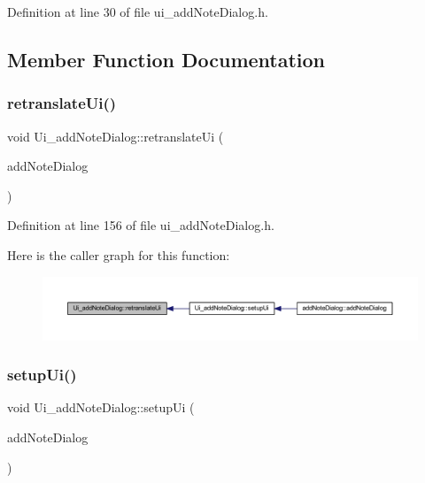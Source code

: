 Definition at line 30 of file ui\+\_\+add\+Note\+Dialog.\+h.



\subsection{Member Function Documentation}
\hypertarget{classUi__addNoteDialog_aab12c63dbd7ceae65cefd5be2a09c2ab}{}\label{classUi__addNoteDialog_aab12c63dbd7ceae65cefd5be2a09c2ab} 
\subsubsection{\texorpdfstring{retranslate\+Ui()}{retranslateUi()}}
{\footnotesize\ttfamily void Ui\+\_\+add\+Note\+Dialog\+::retranslate\+Ui (\begin{DoxyParamCaption}\item[{Q\+Widget $\ast$}]{add\+Note\+Dialog }\end{DoxyParamCaption})\hspace{0.3cm}{\ttfamily [inline]}}



Definition at line 156 of file ui\+\_\+add\+Note\+Dialog.\+h.

Here is the caller graph for this function\+:
\nopagebreak
\begin{figure}[H]
\begin{center}
\leavevmode
\includegraphics[width=350pt]{classUi__addNoteDialog_aab12c63dbd7ceae65cefd5be2a09c2ab_icgraph}
\end{center}
\end{figure}
\hypertarget{classUi__addNoteDialog_a2487f1cd1542da959f06b7412e80ef0b}{}\label{classUi__addNoteDialog_a2487f1cd1542da959f06b7412e80ef0b} 
\subsubsection{\texorpdfstring{setup\+Ui()}{setupUi()}}
{\footnotesize\ttfamily void Ui\+\_\+add\+Note\+Dialog\+::setup\+Ui (\begin{DoxyParamCaption}\item[{Q\+Widget $\ast$}]{add\+Note\+Dialog }\end{DoxyParamCaption})\hspace{0.3cm}{\ttfamily [inline]}}



